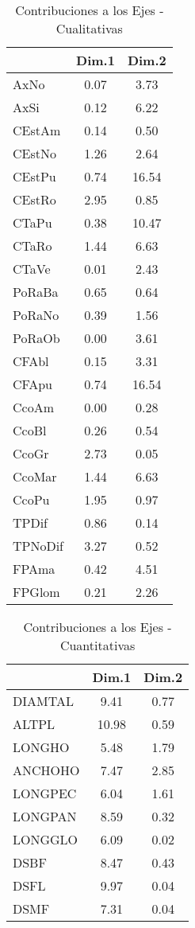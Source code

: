 \documentclass[
]{article}
\begin{document}
\begin{table}[H]

\caption{\label{tab:unnamed-chunk-14}Contribuciones a los Ejes - Cualitativas}
\centering
\fontsize{10}{12}\selectfont
\begin{tabular}[t]{l|c|c}
\hline
  & Dim.1 & Dim.2\\
\hline
AxNo & 0.07 & 3.73\\
\hline
AxSi & 0.12 & 6.22\\
\hline
CEstAm & 0.14 & 0.50\\
\hline
CEstNo & 1.26 & 2.64\\
\hline
CEstPu & 0.74 & 16.54\\
\hline
CEstRo & 2.95 & 0.85\\
\hline
CTaPu & 0.38 & 10.47\\
\hline
CTaRo & 1.44 & 6.63\\
\hline
CTaVe & 0.01 & 2.43\\
\hline
PoRaBa & 0.65 & 0.64\\
\hline
PoRaNo & 0.39 & 1.56\\
\hline
PoRaOb & 0.00 & 3.61\\
\hline
CFAbl & 0.15 & 3.31\\
\hline
CFApu & 0.74 & 16.54\\
\hline
CcoAm & 0.00 & 0.28\\
\hline
CcoBl & 0.26 & 0.54\\
\hline
CcoGr & 2.73 & 0.05\\
\hline
CcoMar & 1.44 & 6.63\\
\hline
CcoPu & 1.95 & 0.97\\
\hline
TPDif & 0.86 & 0.14\\
\hline
TPNoDif & 3.27 & 0.52\\
\hline
FPAma & 0.42 & 4.51\\
\hline
FPGlom & 0.21 & 2.26\\
\hline
\end{tabular}
\end{table}

\begin{table}[H]

\caption{\label{tab:unnamed-chunk-15}Contribuciones a los Ejes - Cuantitativas}
\centering
\fontsize{10}{12}\selectfont
\begin{tabular}[t]{l|c|c}
\hline
  & Dim.1 & Dim.2\\
\hline
DIAMTAL & 9.41 & 0.77\\
\hline
ALTPL & 10.98 & 0.59\\
\hline
LONGHO & 5.48 & 1.79\\
\hline
ANCHOHO & 7.47 & 2.85\\
\hline
LONGPEC & 6.04 & 1.61\\
\hline
LONGPAN & 8.59 & 0.32\\
\hline
LONGGLO & 6.09 & 0.02\\
\hline
DSBF & 8.47 & 0.43\\
\hline
DSFL & 9.97 & 0.04\\
\hline
DSMF & 7.31 & 0.04\\
\hline
\end{tabular}
\end{table}
\end{document}
